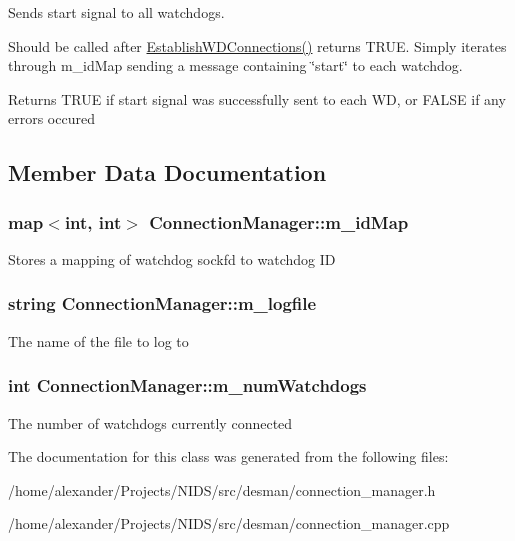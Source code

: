 Sends start signal to all watchdogs. 

Should be called after \hyperlink{classConnectionManager_aeed94353d6c54ffe670d7d5b7482a6d2}{Establish\-W\-D\-Connections()} returns T\-R\-U\-E. Simply iterates through m\-\_\-id\-Map sending a message containing \char`\"{}start\char`\"{} to each watchdog.

\begin{DoxyReturn}{Returns}
T\-R\-U\-E if start signal was successfully sent to each W\-D, or F\-A\-L\-S\-E if any errors occured 
\end{DoxyReturn}


\subsection{Member Data Documentation}
\hypertarget{classConnectionManager_a1ff4d656a7da7080cf53a9ac7496bde5}{
\subsubsection[{m\-\_\-id\-Map}]{\setlength{\rightskip}{0pt plus 5cm}map$<$int, int$>$ Connection\-Manager\-::m\-\_\-id\-Map\hspace{0.3cm}{\ttfamily [private]}}}\label{classConnectionManager_a1ff4d656a7da7080cf53a9ac7496bde5}
Stores a mapping of watchdog sockfd to watchdog I\-D \hypertarget{classConnectionManager_a264f750cd43cf4462de3ca17da78d260}{
\subsubsection[{m\-\_\-logfile}]{\setlength{\rightskip}{0pt plus 5cm}string Connection\-Manager\-::m\-\_\-logfile\hspace{0.3cm}{\ttfamily [private]}}}\label{classConnectionManager_a264f750cd43cf4462de3ca17da78d260}
The name of the file to log to \hypertarget{classConnectionManager_a58b4c08810ff2c3d2c3ab96883ffcccb}{
\subsubsection[{m\-\_\-num\-Watchdogs}]{\setlength{\rightskip}{0pt plus 5cm}int Connection\-Manager\-::m\-\_\-num\-Watchdogs\hspace{0.3cm}{\ttfamily [private]}}}\label{classConnectionManager_a58b4c08810ff2c3d2c3ab96883ffcccb}
The number of watchdogs currently connected 

The documentation for this class was generated from the following files\-:\begin{DoxyCompactItemize}
\item 
/home/alexander/\-Projects/\-N\-I\-D\-S/src/desman/connection\-\_\-manager.\-h\item 
/home/alexander/\-Projects/\-N\-I\-D\-S/src/desman/connection\-\_\-manager.\-cpp\end{DoxyCompactItemize}

